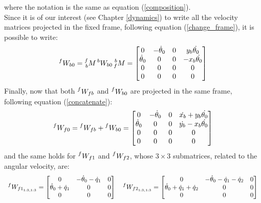 \documentclass[a4paper,12pt,oneside]{report}
\begin{document}
where the notation is the same as equation (\ref{composition}).\\
Since it is of our interest (see Chapter \ref{dynamics}) to write all the velocity matrices projected in the fixed frame, following equation (\ref{change_frame}), it is possible to write:
\begin{equation}
    \prescript{f}{}{W_{b0}}=\prescript{f}{b}{M}\prescript{b}{}{W_{b0}}\prescript{b}{f}{M}=\begin{bmatrix}
      0&-\dot{\theta}_0&0&y_b \dot{\theta_0}\\
      \dot{\theta}_0&0&0&-x_b \dot{\theta_0}\\
      0&0&0&0\\
      0&0&0&0
    \end{bmatrix}
  \label{W_bo}
\end{equation}
Finally, now that both $\prescript{f}{}{W_{fb}}$ and $\prescript{f}{}{W_{b0}}$ are projected in the same frame, following equation (\ref{concatenate}):
\begin{equation}
    \prescript{f}{}{W_{f0}}=\prescript{f}{}{W_{fb}}+\prescript{f}{}{W_{b0}}=\begin{bmatrix}
      0&-\dot{\theta}_0&0&\dot{x_b}+y_b \dot{\theta_0}\\
      \dot{\theta}_0&0&0&\dot{y_b}-x_b \dot{\theta_0}\\
      0&0&0&0\\
      0&0&0&0
    \end{bmatrix}
    \label{arm_1_vel}
\end{equation}
and the same holds for $\prescript{f}{}{W_{f1}}$ and $\prescript{f}{}{W_{f2}}$, whose $3\times 3$ submatrices, related to the angular velocity, are:
  \begin{equation}
    \begin{array}{c}
      \prescript{f}{}{W_{{f1}_{1:3,1:3}}}=\begin{bmatrix}
        0&-\dot{\theta}_0-\dot{q}_1&0\\
        \dot{\theta}_0+\dot{q}_1&0&0\\
        0&0&0
      \end{bmatrix} \quad
      \prescript{f}{}{W_{{f2}_{1:3,1:3}}}=\begin{bmatrix}
        0&-\dot{\theta}_0-\dot{q}_1-\dot{q}_2&0\\
        \dot{\theta}_0+\dot{q}_1+\dot{q}_2&0&0\\
        0&0&0
      \end{bmatrix}
    \end{array}
    \label{arms_velocity}
  \end{equation}
\end{document}
